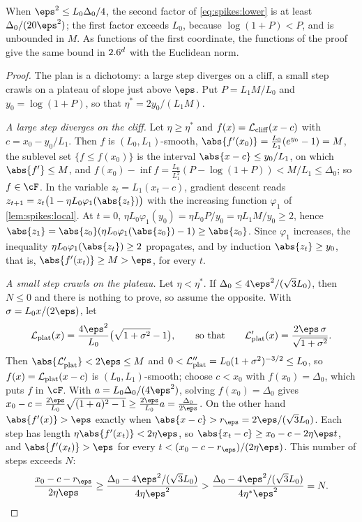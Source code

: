 \begin{refsection}
When $\eps^2\le L_0\Delta_0/4$, the second factor of \eqref{eq:spikes:lower} is at least $\Delta_0/(20\eps^2)$; the first factor exceeds $L_0$, because $\log(1+P)<P$, and is unbounded in $M$. As functions of the first coordinate, the functions of the proof give the same bound in $2.6^d$ with the Euclidean norm.

\begin{proof}
The plan is a dichotomy: a large step diverges on a cliff, a small step crawls on a plateau of slope just above $\eps$. Put $P=L_1M/L_0$ and $y_0=\log(1+P)$, so that $\eta^*=2y_0/(L_1M)$.

\emph{A large step diverges on the cliff.} Let $\eta\ge\eta^*$ and $f(x)=\mathcal{L}_{\mathrm{cliff}}(x-c)$ with $c=x_0-y_0/L_1$. Then $f$ is $(L_0,L_1)$-smooth, $\abs{f'(x_0)}=\frac{L_0}{L_1}(e^{y_0}-1)=M$, the sublevel set $\{f\le f(x_0)\}$ is the interval $\abs{x-c}\le y_0/L_1$, on which $\abs{f'}\le M$, and $f(x_0)-\inf f=\frac{L_0}{L_1^2}(P-\log(1+P))<M/L_1\le\Delta_0$; so $f\in\cF$. In the variable $z_t=L_1(x_t-c)$, gradient descent reads $z_{t+1}=z_t\bigl(1-\eta L_0\varphi_1(\abs{z_t})\bigr)$ with the increasing function $\varphi_1$ of \cref{lem:spikes:local}. At $t=0$, $\eta L_0\varphi_1(y_0)=\eta L_0P/y_0=\eta L_1M/y_0\ge2$, hence $\abs{z_1}=\abs{z_0}(\eta L_0\varphi_1(\abs{z_0})-1)\ge\abs{z_0}$. Since $\varphi_1$ increases, the inequality $\eta L_0\varphi_1(\abs{z_t})\ge2$ propagates, and by induction $\abs{z_t}\ge y_0$, that is, $\abs{f'(x_t)}\ge M>\eps$, for every $t$.

\emph{A small step crawls on the plateau.} Let $\eta<\eta^*$. If $\Delta_0\le4\eps^2/(\sqrt3L_0)$, then $N\le0$ and there is nothing to prove, so assume the opposite. With $\sigma=L_0x/(2\eps)$, let
\[
  \spikesplat(x)=\frac{4\eps^2}{L_0}\bigl(\sqrt{1+\sigma^2}-1\bigr),\qquad\text{so that}\qquad
  \spikesplat'(x)=\frac{2\eps\,\sigma}{\sqrt{1+\sigma^2}} .
\]
Then $\abs{\spikesplat'}<2\eps\le M$ and $0<\mathcal{L}_{\mathrm{plat}}''=L_0(1+\sigma^2)^{-3/2}\le L_0$, so $f(x)=\mathcal{L}_{\mathrm{plat}}(x-c)$ is $(L_0,L_1)$-smooth; choose $c<x_0$ with $f(x_0)=\Delta_0$, which puts $f$ in $\cF$. With $a=L_0\Delta_0/(4\eps^2)$, solving $f(x_0)=\Delta_0$ gives $x_0-c=\frac{2\eps}{L_0}\sqrt{(1+a)^2-1}\ge\frac{2\eps}{L_0}a=\frac{\Delta_0}{2\eps}$. On the other hand $\abs{f'(x)}>\eps$ exactly when $\abs{x-c}>r_\eps=2\eps/(\sqrt3L_0)$. Each step has length $\eta\abs{f'(x_t)}<2\eta\eps$, so $\abs{x_t-c}\ge x_0-c-2\eta\eps t$, and $\abs{f'(x_t)}>\eps$ for every $t<(x_0-c-r_\eps)/(2\eta\eps)$. This number of steps exceeds $N$:
\[
  \frac{x_0-c-r_\eps}{2\eta\eps}\ge\frac{\Delta_0-4\eps^2/(\sqrt3L_0)}{4\eta\eps^2}>\frac{\Delta_0-4\eps^2/(\sqrt3L_0)}{4\eta^*\eps^2}=N.\qedhere
\]
\end{proof}


\end{refsection}

